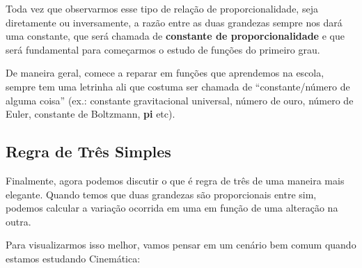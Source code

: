 \begin{tcolorbox}[title = IMPORTANTE]
    Toda vez que observarmos esse tipo de relação de proporcionalidade, seja diretamente ou inversamente, a razão entre as duas grandezas sempre nos dará uma constante, que será chamada de \textbf{constante de proporcionalidade} e que será fundamental para começarmos o estudo de funções do primeiro grau.
\end{tcolorbox}

De maneira geral, comece a reparar em funções que aprendemos na escola, sempre tem uma letrinha ali que costuma ser chamada de ``constante/número de alguma coisa'' (ex.: constante gravitacional universal, número de ouro, número de Euler, constante de Boltzmann, \textbf{pi} etc).

\subsection{Regra de Três Simples} 
Finalmente, agora podemos discutir o que é regra de três de uma maneira mais elegante. Quando temos que duas grandezas são proporcionais entre sim, podemos calcular a variação ocorrida em uma em função de uma alteração na outra.

Para visualizarmos isso melhor, vamos pensar em um cenário bem comum quando estamos estudando Cinemática:

